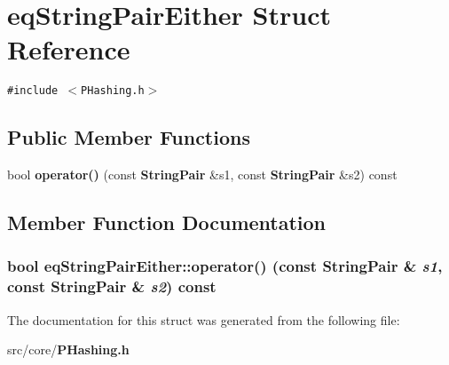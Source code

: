 \section{eq\-String\-Pair\-Either Struct Reference}
\label{structeqStringPairEither}
{\tt \#include $<$PHashing.h$>$}

\subsection*{Public Member Functions}
\begin{CompactItemize}
\item 
bool {\bf operator()} (const {\bf String\-Pair} \&s1, const {\bf String\-Pair} \&s2) const
\end{CompactItemize}


\subsection{Member Function Documentation}
\subsubsection{\setlength{\rightskip}{0pt plus 5cm}bool eq\-String\-Pair\-Either::operator() (const {\bf String\-Pair} \& {\em s1}, const {\bf String\-Pair} \& {\em s2}) const\hspace{0.3cm}{\tt  [inline]}}\label{structeqStringPairEither_ca7e41cb602e2caf1f5d90055129abc9}




The documentation for this struct was generated from the following file:\begin{CompactItemize}
\item 
src/core/{\bf PHashing.h}\end{CompactItemize}
